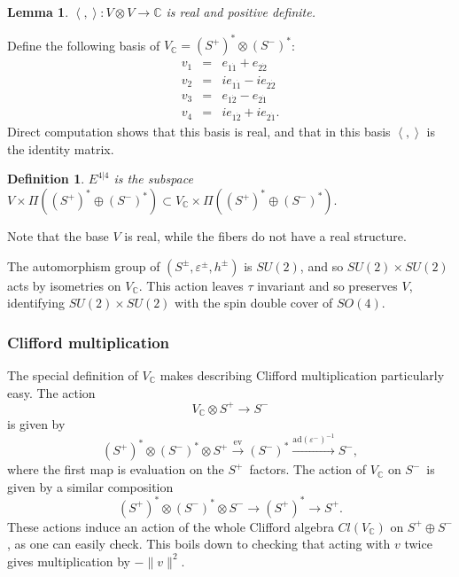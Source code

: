 \documentclass[twoside]{amsart}
\newcommand{\CC}{\ensuremath{\mathbb{C}}}
\newtheorem{definition}{Definition}
\newtheorem{lemma}{Lemma}
\renewcommand{\epsilon}{\varepsilon}
\newcommand{\enm}[1]{\ensuremath{#1}}
\newcommand{\superijk}[3]{\enm{{#1}^{#2|#3}}}
\newcommand{\rrij}[2]{\superijk{E}{#1}{#2}}
\newcommand{\ip}[2]{\enm{\left<#1,#2\right>}}
\newcommand{\sut}{\enm{SU(2)}}
\newcommand{\sof}{\enm{SO(4)}}
\newcommand{\ad}{\enm{\mathrm{ad}}}
\newcommand{\spl}{\enm{S^{+}}}
\newcommand{\sm}{\enm{S^{-}}}
\newcommand{\spd}{\enm{(\spl)^{*}}}
\newcommand{\smd}{\enm{(\sm)^{*}}}
\newcommand{\eps}{\enm{\epsilon}}
\renewcommand{\epsilon}{\varepsilon}
\newcommand{\bothlowerabc}[3]{\enm{{#1}_{#2 #3}}}
\newcommand{\dotbothlowerabc}[3]{\bothlowerabc{#1}{#2}{\dot{#3}}}
\newcommand{\eldl}[2]{\dotbothlowerabc{e}{#1}{#2}}
\begin{document}
\begin{lemma}
    \( \ip{}{}:V\otimes V\to \CC \) is real and positive definite.
\end{lemma}
\proof Define the following basis of \( V_{\CC} = \spd\otimes\smd \):
\begin{eqnarray}
    v_{1} & = & \eldl{1}{1} + \eldl{2}{2}
    \nonumber  \\
    v_{2} & = & i\eldl{1}{1} - i\eldl{2}{2}
    \label{eq:euclbasis}  \\
    v_{3} & = & \eldl{1}{2} - \eldl{2}{1}
    \nonumber  \\
    v_{4} & = & i\eldl{1}{2} + i\eldl{2}{1}.
    \nonumber
\end{eqnarray}
Direct computation shows that this basis is real, and that in this basis \ip{}{} is the identity
matrix.

\begin{definition}
    \( \rrij{4}{4} \) is the subspace \(
    V\times\Pi(\spd\oplus\smd)\subset V_{\CC}\times\Pi(\spd\oplus\smd).
    \)
\end{definition}
Note that the base \( V \) is real, while the fibers do not have a
real structure.

The automorphism group of \( (S^{\pm}, \eps^{\pm}, h^{\pm}) \) is
\sut, and so \( \sut\times\sut \) acts by isometries on \( V_{\CC}.
\) This action leaves \( \tau \) invariant and so preserves \( V \),
identifying \( \sut\times\sut \) with the spin double cover of \sof.

\subsubsection{Clifford multiplication}

The special definition of \( V_{\CC} \) makes describing Clifford
multiplication particularly easy.  The action
\[ V_{\CC}\otimes \spl\to \sm \]
is given by
\[ \spd\otimes\smd\otimes\spl \overset{\mathrm{ev}}{\to}
 \smd \overset{\ad(\eps^-)^{-1}}{\longrightarrow} \sm, \]
where the first map is evaluation on the \spl\ factors. The action of
\( V_{\CC} \) on \sm\ is given by a similar
composition
\[ \spd\otimes\smd\otimes\sm \to \spd \to \spl. \]
These actions induce an action of the whole Clifford algebra \(
Cl(V_{\CC}) \) on \( \spl\oplus\sm \), as one can easily check.  This
boils down to checking that acting with \( v \) twice
gives multiplication by \( -\|v\|^{2}. \)
\end{document}
